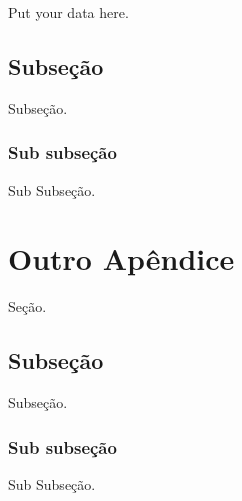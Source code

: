 \documentclass[11pt,a4paper]{article}
\begin{document}
Put your data here.

\subsection{Subseção}
Subseção.

\subsubsection{Sub subseção}
Sub Subseção.


\section{Outro Apêndice}
Seção.

\subsection{Subseção}
Subseção.

\subsubsection{Sub subseção}
Sub Subseção.


\end{document}
